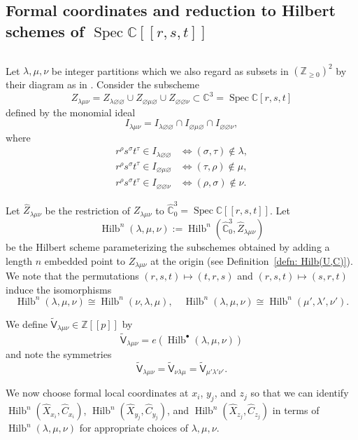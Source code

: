 \documentclass[12pt]{amsart}
\theoremstyle{definition}
\newcommand{\CC} {\mathbb{C}}          %
\newcommand{\ZZ} {\mathbb{Z}}		%
\newcommand{\sfVtilde}{\widetilde{\mathsf{V}}}
\newcommand{\Hilb}{\operatorname{Hilb}}
\newcommand{\Spec}{\operatorname{Spec}}
\renewcommand{\emptyset}{\varnothing}
\renewcommand{\hat}{\widehat}
\newcommand{\Xhat}{\widehat{X}}
\begin{document}
\subsection{Formal coordinates and reduction to Hilbert schemes
of $\Spec \CC [[r,s,t]]$}\label{subsec: Formal coordinates and
reduction to Hilbert scheme on C3}$\quad $

\smallskip

Let $\lambda ,\mu ,\nu$ be integer partitions which we also regard as
subsets in $(\ZZ_{\geq 0})^{2}$ by their diagram as in
\cite{Bryan-Kool-Young}. Consider the subscheme
\[
Z_{\lambda \mu \nu}=Z_{\lambda \emptyset \emptyset}\cup
Z_{\emptyset \mu \emptyset}\cup Z_{\emptyset \emptyset \nu } \subset
\CC^{3}=\Spec \CC [r,s,t]
\]
defined by the monomial ideal
\[
I_{\lambda \mu \nu} = I_{\lambda \emptyset \emptyset}\cap I_{\emptyset \mu \emptyset}\cap I_{\emptyset \emptyset \nu},
\]
where 
\begin{align*}
r^{\rho}s^{\sigma}t^{\tau}\in I_{\lambda \emptyset \emptyset} & \iff
(\sigma ,\tau )\notin \lambda ,\\
r^{\rho}s^{\sigma}t^{\tau}\in I_{\emptyset \mu  \emptyset} & \iff
(\tau,\rho  )\notin \mu ,\\
r^{\rho}s^{\sigma}t^{\tau}\in I_{\emptyset \emptyset \nu } & \iff
(\rho ,\sigma  )\notin \nu . 
\end{align*}

Let $\hat{Z}_{\lambda \mu \nu}$ be the restriction of $Z_{\lambda \mu
\nu}$ to $\hat{\CC}^{3}_{0} = \Spec \CC [[r,s,t]]$. Let
\[
\Hilb^{n}(\lambda ,\mu ,\nu) := \Hilb^{n}(\hat{\CC}^{3}_{0}, \hat{Z}_{\lambda \mu \nu} )
\]
be the Hilbert scheme parameterizing the subschemes obtained by adding
a length $n$ embedded point to $Z_{\lambda \mu \nu}$ at the origin
(see Definition~\ref{defn: Hilb(U,C)}). We note that the permutations
$(r,s,t)\mapsto (t,r,s)$ and $(r,s,t)\mapsto (s,r,t)$ induce the
isomorphisms
\[
\Hilb^{n}(\lambda ,\mu ,\nu )\cong \Hilb^{n}(\nu,\lambda,\mu   ),\quad
\Hilb^{n}(\lambda ,\mu ,\nu )\cong \Hilb^{n}( \mu ',\lambda ',\nu ' ).
\]


We define $\sfVtilde_{\lambda
\mu \nu}\in \ZZ [[p]]$ by
\[
\sfVtilde_{\lambda \mu \nu} = e\left(\Hilb^{\bullet}(\lambda ,\mu ,\nu ) \right)
\]
and note the symmetries 
\[
\sfVtilde_{\lambda \mu \nu}=\sfVtilde_{ \nu \lambda \mu
}=\sfVtilde_{\mu '\lambda '\nu '}.
\]


We now choose formal local coordinates at $x_{i}$, $y_{j}$, and
$z_{j}$ so that we can identify
$\Hilb^{n}(\Xhat_{x_{i}},\hat{C}_{x_{i}})$,
$\Hilb^{n}(\Xhat_{y_{j}},\hat{C}_{y_{j}})$, and
$\Hilb^{n}(\Xhat_{z_{j}},\hat{C}_{z_{j}})$ in terms of
$\Hilb^{n}(\lambda ,\mu ,\nu )$ for appropriate choices of $\lambda
,\mu ,\nu$. 
\end{document}
